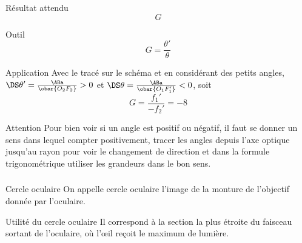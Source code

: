 \documentclass[a4paper, 12pt, final, garamond]{book}
\begin{document}
\subsubsection{}
\begin{tcbraster}[raster columns=6, raster equal height=rows]
    \begin{tcolorbox}[blankest, raster multicolumn=1, space to=\myspace]
        \begin{tcbraster}[raster columns=1]
            \begin{NCprop}[add to natural height=\myspace, valign=top]
                {Résultat attendu}
                $$G$$
            \end{NCprop}
            \begin{NCrapp}{Outil}
                \[ G = \frac{\theta'}{\theta}\]
            \end{NCrapp}
        \end{tcbraster}
    \end{tcolorbox}
    \begin{NCexem}[raster multicolumn=2]{Application}
        Avec le tracé sur le schéma et en considérant des petits angles,
        $\DS \theta' = \frac{\ABa}{\obar{O_2F_2}} > 0$ et $\DS \theta =
        \frac{\ABa}{\obar{O_1F_1'}} < 0$, soit \[ G = \frac{f_1'}{-f_2'} = -8\]
    \end{NCexem}
    \begin{NCror}[raster multicolumn=3]{Attention}
        Pour bien voir si un angle est positif ou négatif, il faut se donner un
        sens dans lequel compter positivement, tracer les angles depuis l'axe
        optique jusqu'au rayon pour voir le changement de direction et dans la
        formule trigonométrique utiliser les grandeurs dans le bon sens.
    \end{NCror}
\end{tcbraster}

\subsubsection{}\label{sssec:k_cercleo}
\begin{tcbraster}[raster columns=2, raster equal height=rows]
    \begin{defi}{Cercle oculaire}
        On appelle cercle oculaire l'image de la monture de l'objectif donnée par
        l'oculaire.
    \end{defi}
    \begin{inte}{Utilité du cercle oculaire}
        Il correspond à la section la plus étroite du faisceau sortant de
        l'oculaire, où l'œil reçoit le maximum de lumière.  
    \end{inte}
\end{tcbraster}
\end{document}
